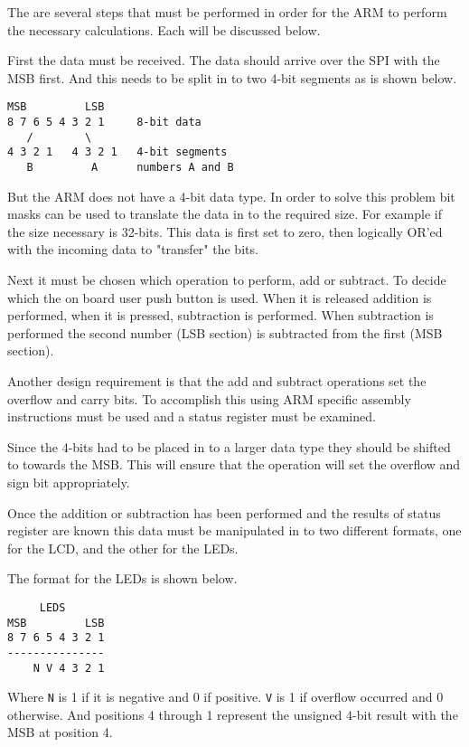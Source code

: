 \documentclass{article}
\begin{document}
The are several steps that must be performed in order for
the ARM to perform the necessary calculations.
Each will be discussed below.

First the data must be received.
The data should arrive over the SPI with the MSB first.
And this needs to be split in to two 4-bit segments
as is shown below.

\begin{verbatim}
MSB         LSB
8 7 6 5 4 3 2 1     8-bit data
   /        \
4 3 2 1   4 3 2 1   4-bit segments
   B         A      numbers A and B
\end{verbatim}

But the ARM does not have a 4-bit data type.
In order to solve this problem bit masks can be used to
translate the data in to the required size.
For example if the size necessary is 32-bits.
This data is first set to zero, then logically OR'ed with
the incoming data to "transfer" the bits.

Next it must be chosen which operation to perform, add or subtract.
To decide which the on board user push button\cite[Pg. 17]{UM1079}
is used.  When it is released addition is performed, when it
is pressed, subtraction is performed.
When subtraction is performed the second number (LSB section)
is subtracted from the first (MSB section).


Another design requirement is that the add and subtract operations
set the overflow and carry bits.
To accomplish this using ARM specific assembly instructions
must be used \cite[Pg. 54]{furber2000arm} and a status
register must be examined\cite[Pg. 40]{furber2000arm}.

Since the 4-bits had to be placed in to a larger data type
they should be shifted to towards the MSB.
This will ensure that the operation will set the overflow and
sign bit appropriately.

Once the addition or subtraction has been performed and the
results of status register are known this data must be
manipulated in to two different formats, one for the LCD,
and the other for the LEDs.

The format for the LEDs is shown below.
\begin{verbatim}
     LEDS
MSB         LSB
8 7 6 5 4 3 2 1
---------------
    N V 4 3 2 1 
\end{verbatim}
Where \verb+N+ is 1 if it is negative and 0 if positive.
\verb+V+ is 1 if overflow occurred and 0 otherwise.
And positions 4 through 1 represent the unsigned 4-bit result
with the MSB at position 4.
\end{document}
